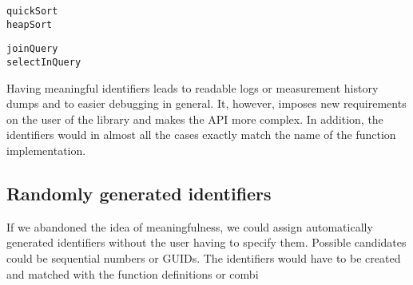 \begin{lstlisting}
quickSort
heapSort
\end{lstlisting}

\begin{lstlisting}
joinQuery
selectInQuery
\end{lstlisting}

Having meaningful identifiers leads to readable logs or measurement history dumps and to easier debugging in general. It, however, imposes new requirements on the user of the library and makes the API more complex. In addition, the identifiers would in almost all the cases exactly match the name of the function implementation.

\subsection{Randomly generated identifiers}
If we abandoned the idea of meaningfulness, we could assign automatically generated identifiers without the user having to specify them. Possible candidates could be sequential numbers or GUIDs. The identifiers would have to be created and matched with the function definitions or combi


